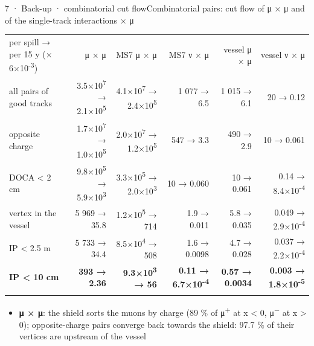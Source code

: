 \begin{btframe}{7 · Back-up · combinatorial cut flow}{Combinatorial pairs: cut flow of μ × μ and of the single-track interactions × μ}
{\fontsize{5.4pt}{7.2pt}\selectfont\setlength{\tabcolsep}{3pt}\renewcommand{\arraystretch}{1.42}
\begin{tabularx}{\linewidth}{>{\raggedright\arraybackslash}Xrrrrr}
\textcolor{muted}{per spill → per 15 y (× 6×10\textsuperscript{-3})} & \textcolor{muted}{μ × μ} & \textcolor{muted}{MS7 μ × μ} & \textcolor{muted}{MS7 ν × μ} & \textcolor{muted}{vessel μ × μ} & \textcolor{muted}{vessel ν × μ} \\\headrule
all pairs of good tracks & 3.5×10\textsuperscript{7} → 2.1×10\textsuperscript{5} & 4.1×10\textsuperscript{7} → 2.4×10\textsuperscript{5} & 1 077 → 6.5 & 1 015 → 6.1 & 20 → 0.12 \\\rowrule
opposite charge & 1.7×10\textsuperscript{7} → 1.0×10\textsuperscript{5} & 2.0×10\textsuperscript{7} → 1.2×10\textsuperscript{5} & 547 → 3.3 & 490 → 2.9 & 10 → 0.061 \\\rowrule
DOCA < 2 cm & 9.8×10\textsuperscript{5} → 5.9×10\textsuperscript{3} & 3.3×10\textsuperscript{5} → 2.0×10\textsuperscript{3} & 10 → 0.060 & 10 → 0.061 & 0.14 → 8.4×10\textsuperscript{-4} \\\rowrule
vertex in the vessel & 5 969 → 35.8 & 1.2×10\textsuperscript{5} → 714 & 1.9 → 0.011 & 5.8 → 0.035 & 0.049 → 2.9×10\textsuperscript{-4} \\\rowrule
IP < 2.5 m & 5 733 → 34.4 & 8.5×10\textsuperscript{4} → 508 & 1.6 → 0.0098 & 4.7 → 0.028 & 0.037 → 2.2×10\textsuperscript{-4} \\\rowrule
\rowcolor{tint}\bfseries IP < 10 cm & \bfseries 393 → 2.36 & \bfseries 9.3×10\textsuperscript{3} → 56 & \bfseries 0.11 → 6.7×10\textsuperscript{-4} & \bfseries 0.57 → 0.0034 & \bfseries 0.003 → 1.8×10\textsuperscript{-5} \\\rowrule
\end{tabularx}\par}
\vspace{3pt}
{\fontsize{6.0pt}{8.2pt}\selectfont
\begin{itemize}
  \item \textbf{μ × μ}: the shield sorts the muons by charge (89 \% of μ\textsuperscript{+} at x < 0, μ\textsuperscript{−} at x > 0); opposite-charge pairs converge back towards the shield: 97.7 \% of their vertices are upstream of the vessel

\end{itemize}}
\end{btframe}
